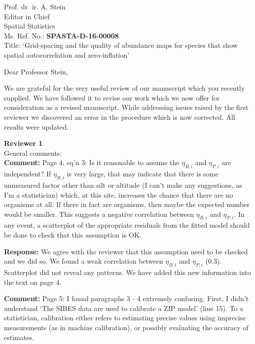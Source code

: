 \documentclass{letter}
\begin{document}
\begin{letter}{
Prof. dr. ir. A. Stein\\
Editor in Chief\\
Spatial Statistics\\
        
\vspace{1cm}
Ms. Ref. No.:  \textbf{SPASTA-D-16-00008}\\
Title: `Grid-spacing and the quality of abundance maps for species that show spatial autocorrelation and zero-inflation'
}

\opening{Dear Professor Stein,}

We are grateful for the very useful review of our manuscript which you recently supplied. We have followed it to revise our work which we now offer for consideration as a revised manuscript. 
While addressing issues raised by the first reviewer we discovered an error in the procedure which is now corrected. All results were updated. 

\textbf{Reviewer 1}\\


General comments:\\

\textbf{Comment:} 
Page 4, eq'n 3: Is it reasonable to assume the $\eta_{B,i}$ and $\eta_{P,i}$ are independent?  If $\eta_{B,i}$ is very large, that may indicate that there is some unmeasured factor other than silt or altitude (I can’t make any suggestions, as I'm a statistician) which, at this site, increases the chance that there are no organisms at all.  If there in fact are organisms, then maybe the expected number would be smaller.  This suggests a negative correlation between $\eta_{B,i}$ and $\eta_{P,i}$. In any event, a scatterplot of the appropriate residuals from the fitted model should be done to check that this assumption is OK.

\textbf{Response:}
We agree with the reviewer that this assumption need to be checked and we did so. We found a weak correlation between $\eta_{B,i}$ and $\eta_{P,i}$ (0.3). Scatterplot did not reveal any patterns.
We have added this new information into the text on page 4.

\textbf{Comment:}
Page 5: I found paragraphs 3 - 4 extremely confusing.  First, I didn't understand `The SIBES data are used to calibrate a ZIP model' (line 15).  To a statistician, calibration either refers to estimating precise values using imprecise measurements (as in machine calibration), or possibly evaluating the accuracy of estimates.  


\end{letter}
\end{document}
